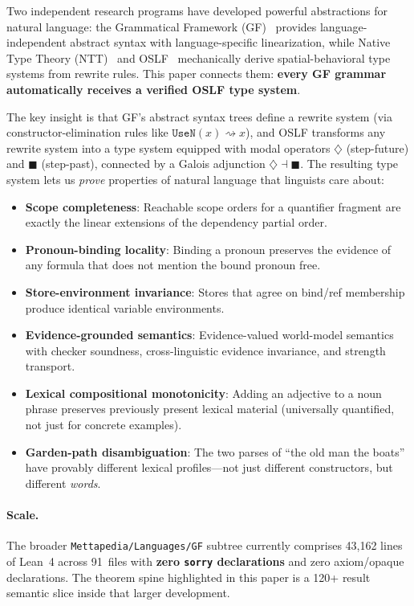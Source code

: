 \documentclass[11pt]{article}
\newcommand{\code}[1]{\texttt{#1}}
\newcommand{\Dia}{\ensuremath{\diamondsuit}}
\newcommand{\Bx}{\ensuremath{\blacksquare}}
\newcommand{\OSLF}{\textup{OSLF}}
\newcommand{\GF}{\textup{GF}}
\newcommand{\NTT}{\textup{NTT}}
\begin{document}
Two independent research programs have developed powerful abstractions for
natural language: the Grammatical Framework (\GF{})~\cite{Ranta2004,Ranta2011}
provides language-independent abstract syntax with language-specific
linearization, while Native Type Theory (\NTT{})~\cite{WilliamsStay2021} and
\OSLF{}~\cite{MeredithStayOSLF2020} mechanically derive spatial-behavioral type systems from
rewrite rules.  This paper connects them: \textbf{every \GF{} grammar
automatically receives a verified \OSLF{} type system}.

The key insight is that \GF{}'s abstract syntax trees define a rewrite system
(via constructor-elimination rules like $\code{UseN}(x) \rightsquigarrow x$),
and \OSLF{} transforms any rewrite system into a type system equipped with
modal operators $\Dia$ (step-future) and $\Bx$ (step-past), connected by a
Galois adjunction $\Dia \dashv \Bx$.  The resulting type system lets us
\emph{prove} properties of natural language that linguists care about:

\begin{itemize}
\item \textbf{Scope completeness}: Reachable scope orders for a
  quantifier fragment are exactly the linear extensions of the
  dependency partial order.
\item \textbf{Pronoun-binding locality}: Binding a pronoun preserves
  the evidence of any formula that does not mention the bound pronoun free.
\item \textbf{Store-environment invariance}: Stores that agree on
  bind/ref membership produce identical variable environments.
\item \textbf{Evidence-grounded semantics}: Evidence-valued world-model
  semantics with checker soundness, cross-linguistic evidence invariance,
  and strength transport.
\item \textbf{Lexical compositional monotonicity}: Adding an adjective
  to a noun phrase preserves previously present lexical material
  (universally quantified, not just for concrete examples).
\item \textbf{Garden-path disambiguation}: The two parses of ``the old man
  the boats'' have provably different lexical profiles---not just different
  constructors, but different \emph{words}.
\end{itemize}

\paragraph{Scale.}  The broader \code{Mettapedia/Languages/GF} subtree currently
comprises 43,162 lines of Lean~4 across 91~files with
\textbf{zero \code{sorry} declarations} and zero axiom/opaque declarations.
The theorem spine highlighted in this paper is a 120+ result semantic slice
inside that larger development.
\end{document}
